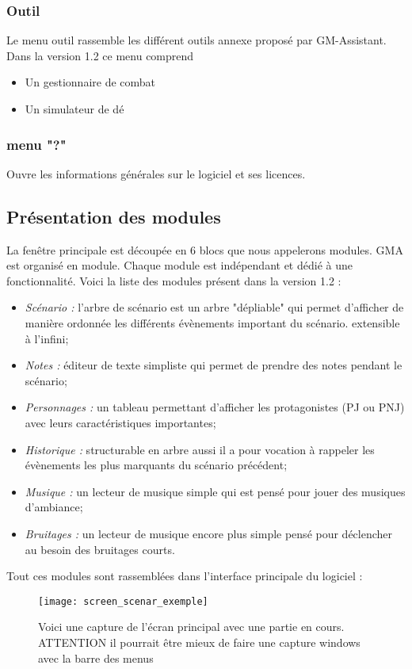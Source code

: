 \documentclass[a4paper,12pt]{article}
\begin{document}
\subsubsection{Outil}
Le menu outil rassemble les différent outils annexe proposé par GM-Assistant.
Dans la version 1.2 ce menu comprend
\begin{itemize}
    \item Un gestionnaire de combat
    \item Un simulateur de dé
\end{itemize}

\subsubsection{menu "?"} Ouvre les informations générales sur le logiciel et ses licences.

\subsection{Présentation des modules}\label{modules}
La fenêtre principale est découpée en 6 blocs que nous appelerons modules.
GMA est organisé en module. Chaque module est indépendant et dédié à une fonctionnalité. Voici la liste des modules présent  dans la version 1.2 :
\begin{itemize}
    \item \emph{Scénario :} l'arbre de scénario est un arbre "dépliable" qui permet d'afficher de manière ordonnée les différents évènements important du scénario. extensible à l'infini;
    \item \emph{Notes :} éditeur de texte simpliste qui permet de prendre des notes pendant le scénario;
    \item \emph{Personnages :} un tableau permettant d'afficher les protagonistes (PJ ou PNJ) avec leurs caractéristiques importantes;
    \item \emph{Historique :} structurable en arbre aussi il a pour vocation à rappeler les évènements les plus marquants du scénario précédent;
    \item \emph{Musique :} un lecteur de musique simple qui est pensé pour jouer des musiques d'ambiance;
    \item \emph{Bruitages :} un lecteur de musique encore plus simple pensé pour déclencher au besoin des bruitages courts.
\end{itemize}
Tout ces modules sont rassemblées dans l'interface principale du logiciel :
\begin{figure}[h]
    \texttt{[image: screen\_scenar\_exemple]}
    \caption{Voici une capture de l'écran principal avec une partie en cours.
    ATTENTION il pourrait être mieux de faire une capture windows avec la barre des menus}
\end{figure}
\end{document}
